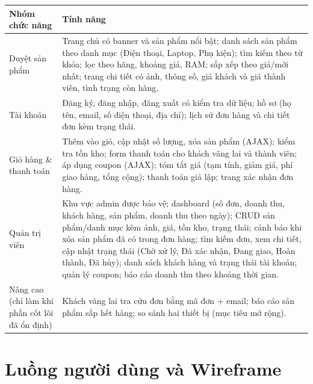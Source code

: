 \documentclass[12pt,a4paper]{article}   %
\begin{document}
\begin{tabularx}{\linewidth}{|L{3.2cm}|Y|}
\hline
{} \textbf{Nhóm chức năng} & \textbf{Tính năng} \\ \hline \endhead
Duyệt sản phẩm & Trang chủ có banner và sản phẩm nổi bật; danh sách sản phẩm theo danh mục
           (Điện thoại, Laptop, Phụ kiện); tìm kiếm theo từ khóa; lọc theo hãng, khoảng giá, RAM;
           sắp xếp theo giá/mới nhất; trang chi tiết có ảnh, thông số, giá khách và giá thành viên,
           tình trạng còn hàng. \\ \hline
Tài khoản  & Đăng ký, đăng nhập, đăng xuất có kiểm tra dữ liệu; hồ sơ (họ tên, email, số điện thoại,
           địa chỉ); lịch sử đơn hàng và chi tiết đơn kèm trạng thái. \\ \hline
Giỏ hàng \& thanh toán & Thêm vào giỏ, cập nhật số lượng, xóa sản phẩm (AJAX); kiểm tra tồn kho;
           form thanh toán cho khách vãng lai và thành viên; áp dụng coupon (AJAX); tóm tắt giá (tạm tính,
           giảm giá, phí giao hàng, tổng cộng); thanh toán giả lập; trang xác nhận đơn hàng. \\ \hline
Quản trị viên & Khu vực admin được bảo vệ; dashboard (số đơn, doanh thu, khách hàng, sản phẩm, doanh thu
           theo ngày); CRUD sản phẩm/danh mục kèm ảnh, giá, tồn kho, trạng thái; cảnh báo khi xóa sản phẩm
           đã có trong đơn hàng; tìm kiếm đơn, xem chi tiết, cập nhật trạng thái (Chờ xử lý, Đã xác nhận,
           Đang giao, Hoàn thành, Đã hủy); danh sách khách hàng và trạng thái tài khoản; quản lý coupon;
           báo cáo doanh thu theo khoảng thời gian. \\ \hline
Nâng cao (chỉ làm khi phần cốt lõi đã ổn định) & Khách vãng lai tra cứu đơn bằng mã đơn + email;
           báo cáo sản phẩm sắp hết hàng; so sánh hai thiết bị (mục tiêu mở rộng). \\ \hline
\end{tabularx}

\section{Luồng người dùng và Wireframe}
\end{document}
